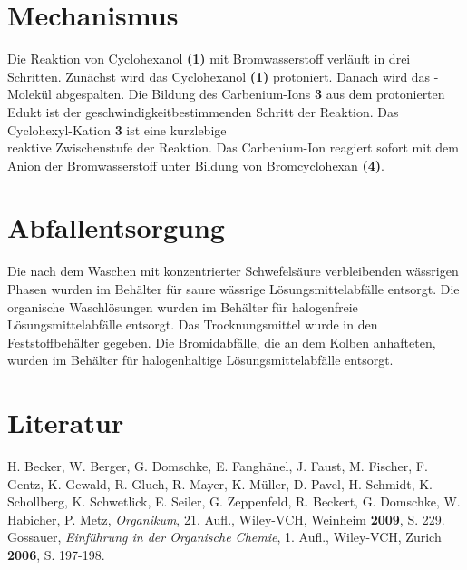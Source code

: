 \documentclass[12pt]{article}
\begin{document}
\begin{onehalfspace}
\section{Mechanismus\cite{bio}} 

Die Reaktion von Cyclohexanol \textbf{(1)} mit Bromwasserstoff verläuft in drei Schritten. Zunächst wird das Cyclohexanol \textbf{(1)} protoniert. Danach wird das -Molekül abgespalten. Die Bildung des Carbenium-Ions \textbf{3} aus dem protonierten Edukt ist der geschwindigkeitbestimmenden Schritt der Reaktion. Das Cyclohexyl-Kation \textbf{3} ist eine kurzlebige \\ reaktive Zwischenstufe der Reaktion. Das Carbenium-Ion reagiert sofort mit dem Anion der Bromwasserstoff unter Bildung von Bromcyclohexan \textbf{(4)}.
     
\section{Abfallentsorgung}

Die nach dem Waschen mit konzentrierter Schwefelsäure verbleibenden wässrigen Phasen wurden im Behälter für saure wässrige Lösungsmittelabfälle entsorgt. Die 
organische Waschlösungen wurden im Behälter für halogenfreie Lösungsmittelabfälle entsorgt. Das Trocknungsmittel wurde in den Feststoffbehälter gegeben. Die Bromidabfälle, die an dem Kolben anhafteten, wurden im Behälter für halogenhaltige Lösungsmittelabfälle entsorgt. 

\section{Literatur}
\renewcommand{\section}[2]{}%
\begin{thebibliography}{}

H. Becker, W. Berger, G. Domschke, E. Fanghänel, J. Faust, M. Fischer, F. Gentz, K. Gewald, R. Gluch, R. Mayer, K. Müller, D. Pavel, H. Schmidt,  K. Schollberg, K. Schwetlick, E. Seiler, G. Zeppenfeld, R. Beckert, G. Domschke, W. Habicher, P. Metz, \textit{Organikum},  21. Aufl., Wiley-VCH, Weinheim \textbf{2009}, S. 229.  
Gossauer, \textit{Einführung in der Organische Chemie}, 1. Aufl., Wiley-VCH, Zurich \textbf{2006}, S. 197-198.  
\end{thebibliography}
\end{onehalfspace}
\end{document}
